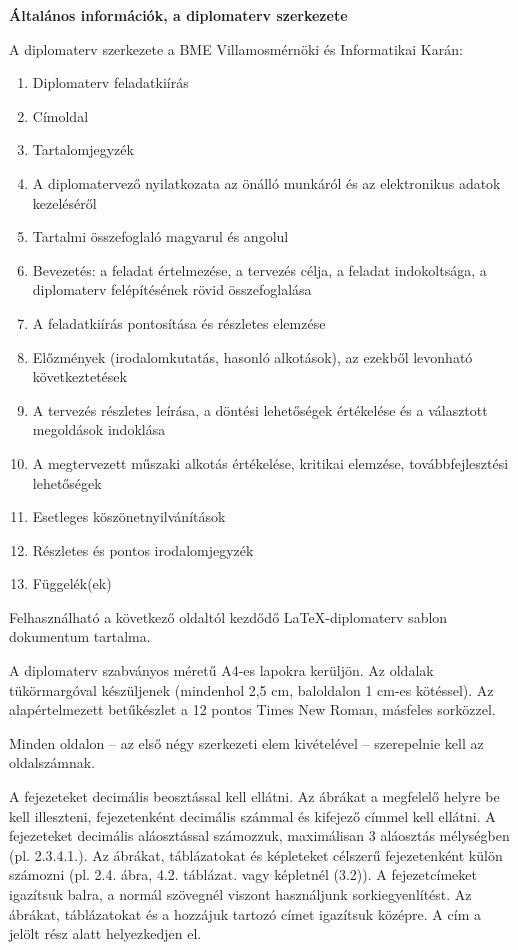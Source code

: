 \textbf{Általános információk, a diplomaterv szerkezete}

A diplomaterv szerkezete a BME Villamosmérnöki és Informatikai Karán:

\begin{enumerate}
\def\labelenumi{\arabic{enumi}.}
\itemsep1pt\parskip0pt
\item
  Diplomaterv feladatkiírás
\item
  Címoldal
\item
  Tartalomjegyzék
\item
  A diplomatervező nyilatkozata az önálló munkáról és az elektronikus
  adatok kezeléséről
\item
  Tartalmi összefoglaló magyarul és angolul
\item
  Bevezetés: a feladat értelmezése, a tervezés célja, a feladat
  indokoltsága, a diplomaterv felépítésének rövid összefoglalása
\item
  A feladatkiírás pontosítása és részletes elemzése
\item
  Előzmények (irodalomkutatás, hasonló alkotások), az ezekből levonható
  következtetések
\item
  A tervezés részletes leírása, a döntési lehetőségek értékelése és a
  választott megoldások indoklása
\item
  A megtervezett műszaki alkotás értékelése, kritikai elemzése,
  továbbfejlesztési lehetőségek
\item
  Esetleges köszönetnyilvánítások
\item
  Részletes és pontos irodalomjegyzék
\item
  Függelék(ek)
\end{enumerate}

Felhasználható a következő oldaltól kezdődő \LaTeX-diplomaterv sablon
dokumentum tartalma.

A diplomaterv szabványos méretű A4-es lapokra kerüljön. Az oldalak
tükörmargóval készüljenek (mindenhol 2,5 cm, baloldalon 1 cm-es
kötéssel). Az alapértelmezett betűkészlet a 12 pontos Times New Roman,
másfeles sorközzel.

Minden oldalon -- az első négy szerkezeti elem kivételével --
szerepelnie kell az oldalszámnak.

A fejezeteket decimális beosztással kell ellátni. Az ábrákat a megfelelő
helyre be kell illeszteni, fejezetenként decimális számmal és kifejező
címmel kell ellátni. A fejezeteket decimális aláosztással számozzuk,
maximálisan 3 aláosztás mélységben (pl. 2.3.4.1.). Az ábrákat,
táblázatokat és képleteket célszerű fejezetenként külön számozni (pl.
2.4. ábra, 4.2. táblázat. vagy képletnél (3.2)). A fejezetcímeket
igazítsuk balra, a normál szövegnél viszont használjunk
sorkiegyenlítést. Az ábrákat, táblázatokat és a hozzájuk tartozó címet
igazítsuk középre. A cím a jelölt rész alatt helyezkedjen el.

